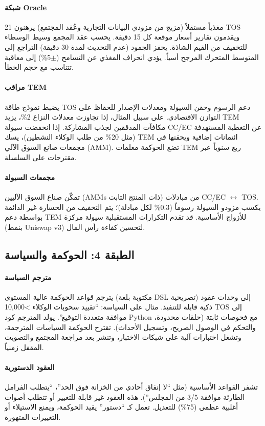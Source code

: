 \documentclass[11pt]{article}
\begin{document}
\paragraph{شبكة Oracle} 21 مغذياً مستقلاً (مزيج من مزودي البيانات التجارية وعُقد المجتمع) يرهنون TOS ويقدمون تقارير أسعار موقعة كل 15 دقيقة. يحسب عقد المجمع وسيط الوسطاء للتخفيف من القيم الشاذة. يحفز الجمود (عدم التحديث لمدة 30 دقيقة) التراجع إلى المتوسط المتحرك المرجح أسياً. يؤدي انحراف المغذي عن التسامح ($\pm$5\%) إلى معاقبة تتناسب مع حجم الخطأ.

\paragraph{مراقب TEM} يضبط نموذج طاقة TOS دعم الرسوم وحقن السيولة ومعدلات الإصدار للحفاظ على التوازن الاقتصادي. على سبيل المثال، إذا تجاوزت معدلات النزاع 2\%، يزيد TEM مكافآت المدققين لجذب المشاركة. إذا انخفضت سيولة CC/EC عن التغطية المستهدفة (مثل 20\% من طلب الوكلاء النشطين)، يسك TEM ائتمانات إضافية ويحقنها في مجمعات صانع السوق الآلي (AMM). تضع الحوكمة معلمات TEM ربع سنوياً عبر مقترحات على السلسلة.

\paragraph{مجمعات السيولة} تمكّن صناع السوق الآليين (AMMs ذات المنتج الثابت) من مبادلات CC/EC $\leftrightarrow$ TOS. يكسب مزودو السيولة رسوماً (0.3\% لكل مبادلة)؛ يتم التخفيف من الخسارة غير الدائمة بواسطة دعم TEM للأزواج الأساسية. قد تقدم التكرارات المستقبلية سيولة مركزة (بنمط Uniswap v3) لتحسين كفاءة رأس المال.

\subsection{الطبقة 4: الحوكمة والسياسة}
\paragraph{مترجم السياسة} يترجم قواعد الحوكمة عالية المستوى (مكتوبة بلغة DSL تصريحية) إلى وحدات عقود ذكية قابلة للتنفيذ. مثال على السياسة: ``تقييد سحوبات الوكلاء >10,000 TOS إلى موافقة متعددة التوقيع''. يولد المترجم كود Python مع فحوصات ثابتة (حلقات محدودة، والتحكم في الوصول الصريح، وتسجيل الأحداث). تقترح الحوكمة السياسات المترجمة، وتشغل اختبارات آلية على شبكات الاختبار، وتنشر بعد مراجعة المجتمع والتصويت المقفل زمنياً.

\paragraph{العقود الدستورية} تشفر القواعد الأساسية (مثل ``لا إنفاق أحادي من الخزانة فوق الحد''، ``يتطلب الفرامل الطارئة موافقة 3/5 من المجلس''). هذه العقود غير قابلة للتغيير أو تتطلب أصوات أغلبية عظمى (75\%) للتعديل. تعمل كـ ``دستور'' يقيد الحوكمة، ويمنع الاستيلاء أو التغييرات المتهورة.
\end{document}
